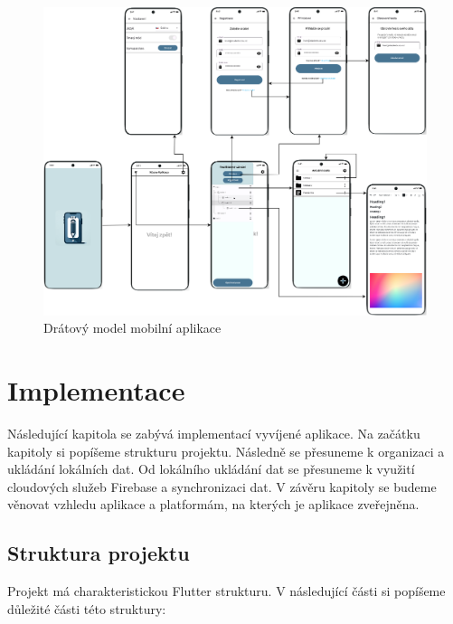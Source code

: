 \documentclass[czech, bc, kiv, he, iso690numb]{fasthesis}
\begin{document}
\begin{landscape}

\begin{figure}[h]
  \centering
  \includegraphics[width=1.2\textwidth]{img/BP-Runt/Planning/UI/drátový_model.png}
  \caption{Drátový model mobilní aplikace}
  \label{fig:wireframing-diagram}
\end{figure}

\end{landscape}


%
%
%
%
\chapter{Implementace}

Následující kapitola se zabývá implementací vyvíjené aplikace. Na začátku kapitoly si popíšeme strukturu projektu. Následně se přesuneme k organizaci a ukládání lokálních dat. Od lokálního ukládání dat se přesuneme k využití cloudových služeb Firebase a synchronizaci dat. V závěru kapitoly se budeme věnovat vzhledu aplikace a platformám, na kterých je aplikace zveřejněna.

\section{Struktura projektu}

 Projekt má charakteristickou Flutter strukturu. V následující části si popíšeme důležité části této struktury:
\end{document}
